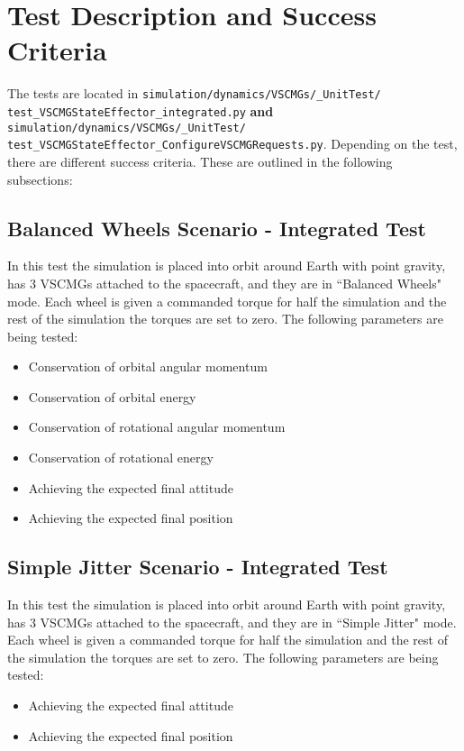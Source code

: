 \section{Test Description and Success Criteria}
The tests are located in \texttt{simulation/dynamics/VSCMGs/\_UnitTest/\newline
test\_VSCMGStateEffector\_integrated.py} \textbf{and} \texttt{simulation/dynamics/VSCMGs/\newline\_UnitTest/
test\_VSCMGStateEffector\_ConfigureVSCMGRequests.py}. Depending on the test, there are different success criteria. These are outlined in the following subsections:
\subsection{Balanced Wheels Scenario - Integrated Test}
In this test the simulation is placed into orbit around Earth with point gravity, has 3 VSCMGs attached to the spacecraft, and they are in ``Balanced Wheels" mode. Each wheel is given a commanded torque for half the simulation and the rest of the simulation the torques are set to zero. The following parameters are being tested:
\begin{itemize}
	\item Conservation of orbital angular momentum
	\item Conservation of orbital energy
	\item Conservation of rotational angular momentum
	\item Conservation of rotational energy
	\item Achieving the expected final attitude
	\item Achieving the expected final position
\end{itemize}

\subsection{Simple Jitter Scenario - Integrated Test}
In this test the simulation is placed into orbit around Earth with point gravity, has 3 VSCMGs attached to the spacecraft, and they are in ``Simple Jitter" mode. Each wheel is given a commanded torque for half the simulation and the rest of the simulation the torques are set to zero. The following parameters are being tested:
\begin{itemize}
\item Achieving the expected final attitude
\item Achieving the expected final position
\end{itemize}

